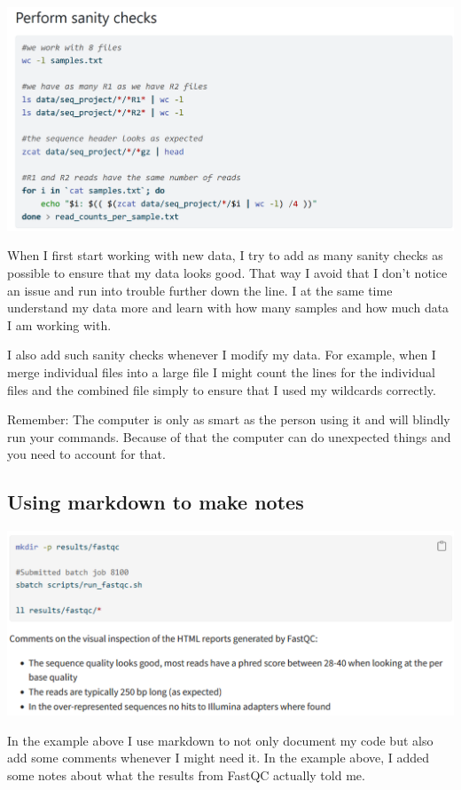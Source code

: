 \documentclass[
  letterpaper,
  DIV=11,
  numbers=noendperiod]{scrreprt}
\begin{document}
\includegraphics[width=5.84375in,height=\textheight]{../img/sanity_check.png}

When I first start working with new data, I try to add as many sanity
checks as possible to ensure that my data looks good. That way I avoid
that I don't notice an issue and run into trouble further down the line.
I at the same time understand my data more and learn with how many
samples and how much data I am working with.

I also add such sanity checks whenever I modify my data. For example,
when I merge individual files into a large file I might count the lines
for the individual files and the combined file simply to ensure that I
used my wildcards correctly.

Remember: The computer is only as smart as the person using it and will
blindly run your commands. Because of that the computer can do
unexpected things and you need to account for that.

\subsection{Using markdown to make
notes}\label{using-markdown-to-make-notes}

\includegraphics[width=5.65625in,height=\textheight]{../img/comments_in_code.png}

In the example above I use markdown to not only document my code but
also add some comments whenever I might need it. In the example above, I
added some notes about what the results from FastQC actually told me.
\end{document}
